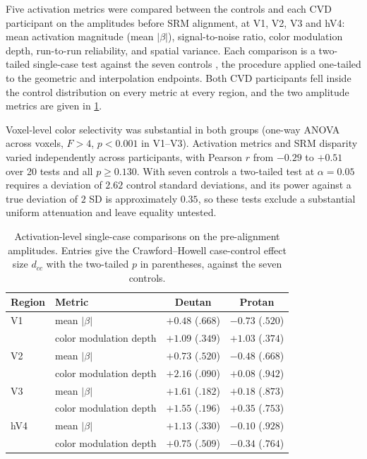 
Five activation metrics were compared between the controls and each CVD participant on the amplitudes before SRM alignment, at V1, V2, V3 and hV4: mean activation magnitude (mean $|\beta|$), signal-to-noise ratio, color modulation depth, run-to-run reliability, and spatial variance. Each comparison is a two-tailed single-case test against the seven controls \parencite{crawford1998}, the procedure applied one-tailed to the geometric and interpolation endpoints. Both CVD participants fell inside the control distribution on every metric at every region, and the two amplitude metrics are given in \cref{tab:activation}.

Voxel-level color selectivity was substantial in both groups (one-way ANOVA across voxels, $F > 4$, $p < 0.001$ in V1--V3). Activation metrics and SRM disparity varied independently across participants, with Pearson $r$ from $-0.29$ to $+0.51$ over 20 tests and all $p \geq 0.130$. With seven controls a two-tailed test at $\alpha = 0.05$ requires a deviation of $2.62$ control standard deviations, and its power against a true deviation of $2$ SD is approximately $0.35$, so these tests exclude a substantial uniform attenuation and leave equality untested.

\begin{table}[h]
\centering
\caption{Activation-level single-case comparisons on the pre-alignment amplitudes. Entries give the Crawford--Howell case-control effect size $d_{cc}$ with the two-tailed $p$ in parentheses, against the seven controls.}
\label{tab:activation}
\small
\begin{tabular}{llcc}
\toprule
Region & Metric & Deutan & Protan \\
\midrule
V1  & mean $|\beta|$           & $+0.48$ ($.668$) & $-0.73$ ($.520$) \\
    & color modulation depth   & $+1.09$ ($.349$) & $+1.03$ ($.374$) \\
\addlinespace
V2  & mean $|\beta|$           & $+0.73$ ($.520$) & $-0.48$ ($.668$) \\
    & color modulation depth   & $+2.16$ ($.090$) & $+0.08$ ($.942$) \\
\addlinespace
V3  & mean $|\beta|$           & $+1.61$ ($.182$) & $+0.18$ ($.873$) \\
    & color modulation depth   & $+1.55$ ($.196$) & $+0.35$ ($.753$) \\
\addlinespace
hV4 & mean $|\beta|$           & $+1.13$ ($.330$) & $-0.10$ ($.928$) \\
    & color modulation depth   & $+0.75$ ($.509$) & $-0.34$ ($.764$) \\
\bottomrule
\end{tabular}
\end{table}



